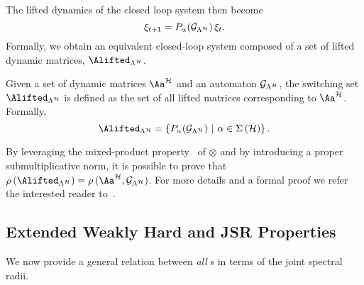 %
The lifted dynamics of the closed loop system then become%
%
\begin{equation*}
    \xi_{t+1} = P_{\alpha} ( \mathcal{G}_{\Lambda^{\mathcal{H}}} )\,\xi_t.
\end{equation*}
%
Formally, we obtain an equivalent closed-loop system composed of a set of lifted dynamic matrices, $\Alifted_{\Lambda^\strat}$.
%
\begin{definition}%
    \label{def:switching_set}%
    Given a set of dynamic matrices $\Aa^{\strat}$ and an automaton $\mathcal{G}_{\Lambda^{\mathcal{H}}}$, the switching set $\Alifted_{\Lambda^\strat}$ is defined as the set of all lifted matrices corresponding to $\Aa^{\strat}$.
    Formally,
    \begin{equation*}
        \Alifted_{\Lambda^\strat} = \left\{ P_{\alpha} ( \GG{\Lambda^\strat} ) \,\, | \,\, \alpha \in \Sigma\left(\strat\right) \right\}.
    \end{equation*}
\end{definition}
%
By leveraging the mixed-product property~\cite{horn2012matrix} of $\otimes$ and by introducing a proper submultiplicative norm, it is possible to prove that $\rho\left(\Alifted_{\Lambda^\strat}\right)= \rho\,(\Aa^{\strat},\GG{\Lambda^\strat})$.
For more details and a formal proof we refer the interested reader to~\cite{xu2020approximation}.


\subsection{Extended Weakly Hard and JSR Properties}
\label{sec:analytic_results}
%
We now provide a general relation between \emph{all} \ewhc{}s in terms of the joint spectral radii.


